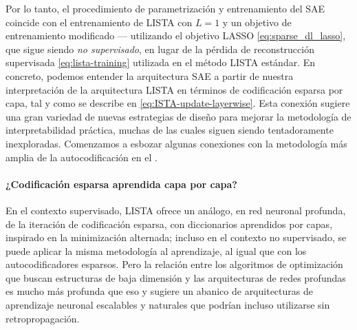 \documentclass[../../book-main.tex]{subfiles}
\begin{document}
Por lo tanto, el procedimiento de parametrización y entrenamiento del SAE coincide con
el entrenamiento de LISTA con $L=1$ y un objetivo de entrenamiento modificado --- utilizando el
objetivo LASSO \eqref{eq:sparse_dl_lasso}, que sigue siendo {\em no supervisado}, en lugar 
de la pérdida de reconstrucción supervisada \eqref{eq:lista-training} utilizada en el método
LISTA estándar. En concreto, podemos entender la arquitectura SAE a partir de nuestra
interpretación de la arquitectura LISTA en términos de codificación esparsa por capa, tal 
y como se describe en \eqref{eq:ISTA-update-layerwise}. Esta conexión sugiere una gran variedad de nuevas
estrategias de diseño para mejorar la metodología de interpretabilidad práctica, muchas de
las cuales siguen siendo tentadoramente inexploradas. Comenzamos a esbozar 
algunas conexiones con la metodología más amplia de la autocodificación en 
el .

\paragraph{¿Codificación esparsa aprendida capa por capa?}

En el contexto supervisado, LISTA ofrece un análogo, en red neuronal profunda, de
la iteración de codificación esparsa, con diccionarios aprendidos por capas, inspirado en
la minimización alternada; incluso en el contexto no supervisado, se puede aplicar la misma metodología
al aprendizaje, al igual que con los autocodificadores esparsos.
Pero la relación entre los algoritmos de optimización
que buscan estructuras de baja dimensión y las arquitecturas de redes profundas es mucho más 
profunda que eso y sugiere un abanico de arquitecturas de aprendizaje neuronal escalables 
y naturales que podrían incluso utilizarse sin retropropagación.
\end{document}
